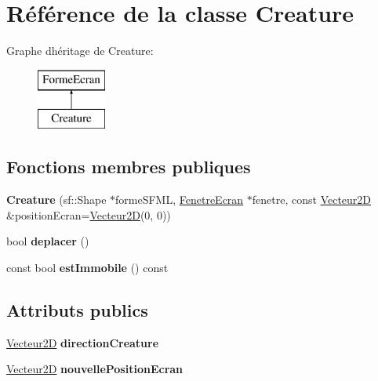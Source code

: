 \hypertarget{class_creature}{}\section{Référence de la classe Creature}
\label{class_creature}
Graphe d\textquotesingle{}héritage de Creature\+:\begin{figure}[H]
\begin{center}
\leavevmode
\includegraphics[height=2.000000cm]{class_creature}
\end{center}
\end{figure}
\subsection*{Fonctions membres publiques}
\begin{DoxyCompactItemize}
\item 
\mbox{\label{class_creature_ae6582091f049dd634af356bfa300c79c}} 
{\bfseries Creature} (sf\+::\+Shape $\ast$forme\+S\+F\+ML, \mbox{\hyperlink{class_fenetre_ecran}{Fenetre\+Ecran}} $\ast$fenetre, const \mbox{\hyperlink{class_vecteur2_d}{Vecteur2D}} \&position\+Ecran=\mbox{\hyperlink{class_vecteur2_d}{Vecteur2D}}(0, 0))
\item 
\mbox{\label{class_creature_a7c2d848ee2a3cb1f3c91b35a7eb504f6}} 
bool {\bfseries deplacer} ()
\item 
\mbox{\label{class_creature_aafcbed99d0ee57caff3208c3bac7b400}} 
const bool {\bfseries est\+Immobile} () const
\end{DoxyCompactItemize}
\subsection*{Attributs publics}
\begin{DoxyCompactItemize}
\item 
\mbox{\label{class_creature_a95ac7239d76b5a5b8eedf13243cb9ec8}} 
\mbox{\hyperlink{class_vecteur2_d}{Vecteur2D}} {\bfseries direction\+Creature}
\item 
\mbox{\label{class_creature_a5266d7ca7642264806e07ea4926442e7}} 
\mbox{\hyperlink{class_vecteur2_d}{Vecteur2D}} {\bfseries nouvelle\+Position\+Ecran}
\end{DoxyCompactItemize}
